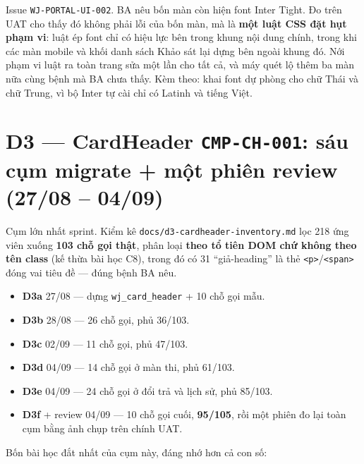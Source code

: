 Issue \texttt{WJ-PORTAL-UI-002}. BA nêu bốn màn còn hiện font Inter Tight. Đo trên UAT cho
thấy đó không phải lỗi của bốn màn, mà là \textbf{một luật CSS đặt hụt phạm vi}: luật ép font
chỉ có hiệu lực bên trong khung nội dung chính, trong khi các màn mobile và khối danh sách
Khảo sát lại dựng bên ngoài khung đó. Nới phạm vi luật ra toàn trang sửa một lần cho tất cả,
và máy quét lộ thêm ba màn nữa cùng bệnh mà BA chưa thấy. Kèm theo: khai font dự phòng cho
chữ Thái và chữ Trung, vì bộ Inter tự cài chỉ có Latinh và tiếng Việt.

\section{D3 --- CardHeader \texttt{CMP-CH-001}: sáu cụm migrate + một phiên review (27/08 -- 04/09)}

Cụm lớn nhất sprint. Kiểm kê \texttt{docs/d3-cardheader-inventory.md} lọc 218 ứng viên xuống
\textbf{103 chỗ gọi thật}, phân loại \textbf{theo tổ tiên DOM chứ không theo tên class} (kế
thừa bài học C8), trong đó có 31 ``giả-heading'' là thẻ \texttt{<p>}/\texttt{<span>} đóng vai
tiêu đề --- đúng bệnh BA nêu.

\begin{itemize}
\item \textbf{D3a} 27/08 --- dựng \texttt{wj\_card\_header} + 10 chỗ gọi mẫu.
\item \textbf{D3b} 28/08 --- 26 chỗ gọi, phủ 36/103.
\item \textbf{D3c} 02/09 --- 11 chỗ gọi, phủ 47/103.
\item \textbf{D3d} 04/09 --- 14 chỗ gọi ở màn thi, phủ 61/103.
\item \textbf{D3e} 04/09 --- 24 chỗ gọi ở đổi trả và lịch sử, phủ 85/103.
\item \textbf{D3f} + review 04/09 --- 10 chỗ gọi cuối, \textbf{95/105}, rồi một phiên đo lại
  toàn cụm bằng ảnh chụp trên chính UAT.
\end{itemize}

Bốn bài học đắt nhất của cụm này, đáng nhớ hơn cả con số:

